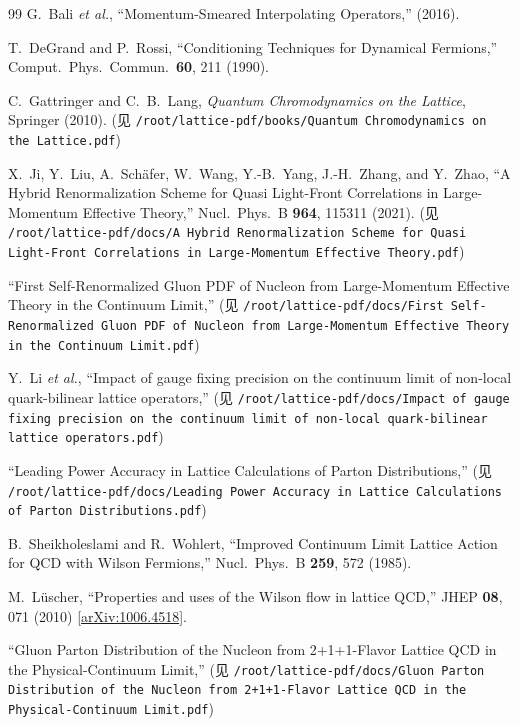 \documentclass[12pt,a4paper]{ctexart}
\begin{document}
\begin{thebibliography}{99}
G.~Bali \textit{et al.},
``Momentum-Smeared Interpolating Operators,''
(2016).

T.~DeGrand and P.~Rossi,
``Conditioning Techniques for Dynamical Fermions,''
Comput.\ Phys.\ Commun.\ \textbf{60}, 211 (1990).

C.~Gattringer and C.~B.~Lang,
\textit{Quantum Chromodynamics on the Lattice},
Springer (2010).
(见 \texttt{/root/lattice-pdf/books/Quantum Chromodynamics on the Lattice.pdf})

X.~Ji, Y.~Liu, A.~Sch\"afer, W.~Wang, Y.-B.~Yang, J.-H.~Zhang, and Y.~Zhao,
``A Hybrid Renormalization Scheme for Quasi Light-Front Correlations in Large-Momentum Effective Theory,''
Nucl.\ Phys.\ B \textbf{964}, 115311 (2021).
(见 \texttt{/root/lattice-pdf/docs/A Hybrid Renormalization Scheme for Quasi Light-Front Correlations in Large-Momentum Effective Theory.pdf})

``First Self-Renormalized Gluon PDF of Nucleon from Large-Momentum Effective Theory in the Continuum Limit,''
(见 \texttt{/root/lattice-pdf/docs/First Self-Renormalized Gluon PDF of Nucleon from Large-Momentum Effective Theory in the Continuum Limit.pdf})

Y.~Li \textit{et al.},
``Impact of gauge fixing precision on the continuum limit of non-local quark-bilinear lattice operators,''
(见 \texttt{/root/lattice-pdf/docs/Impact of gauge fixing precision on the continuum limit of non-local quark-bilinear lattice operators.pdf})

``Leading Power Accuracy in Lattice Calculations of Parton Distributions,''
(见 \texttt{/root/lattice-pdf/docs/Leading Power Accuracy in Lattice Calculations of Parton Distributions.pdf})

B.~Sheikholeslami and R.~Wohlert,
``Improved Continuum Limit Lattice Action for QCD with Wilson Fermions,''
Nucl.\ Phys.\ B \textbf{259}, 572 (1985).

M.~L\"uscher,
``Properties and uses of the Wilson flow in lattice QCD,''
JHEP \textbf{08}, 071 (2010)
[\href{https://arxiv.org/abs/1006.4518}{arXiv:1006.4518}].

``Gluon Parton Distribution of the Nucleon from 2+1+1-Flavor Lattice QCD in the Physical-Continuum Limit,''
(见 \texttt{/root/lattice-pdf/docs/Gluon Parton Distribution of the Nucleon from 2+1+1-Flavor Lattice QCD in the Physical-Continuum Limit.pdf})

\end{thebibliography}
\end{document}
